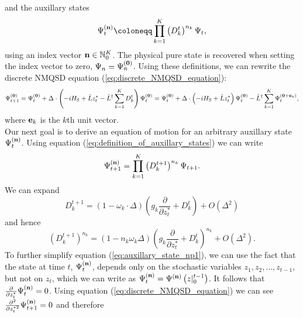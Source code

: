 and the auxillary states
\begin{equation}
    \label{eq:definition_of_auxillary_states}
    \Psi_t^{(\vectorbold{n})} \coloneqq \prod_{k=1}^{K} \left(D_k^t\right)^{n_k}\Psi_t,
\end{equation}
using an index vector $\vectorbold{n}\in\mathbb{N}_0^{K}$. The physical pure state is
recovered when setting the index vector to zero, $\Psi_n = \Psi_n^{(\vectorbold{0})}$.
Using these definitions, we can rewrite the discrete NMQSD equation (\ref{eq:discrete_NMQSD_equation}):
\begin{equation*}
    \Psi_{t+1}^{(\vectorbold{0})} = \Psi_{t}^{(\vectorbold{0})} + \Delta \cdot \left(
        -iH_\text{S} + \hat{L}z_t^* - \hat{L}^\dagger\sum_{k=1}^{K}D_k^t
    \right) \Psi_{t}^{(\vectorbold{0})}
    = \Psi_{t}^{(\vectorbold{0})} + \Delta \cdot \left(
        -iH_\text{S} + \hat{L}z_t^*
    \right) \Psi_{t}^{(\vectorbold{0})} - \hat{L}^\dagger\sum_{k=1}^{K}\Psi_t^{(\vectorbold{0}+\vectorbold{e}_k)},
\end{equation*}
where $\vectorbold{e}_k$ is the $k$th unit vector.
\\
Our next goal is to derive an equation of motion for an arbitrary auxillary state $\Psi_t^{(\vectorbold{n})}$.
Using equation (\ref{eq:definition_of_auxillary_states}) we can write
\begin{equation}
    \label{eq:auxillary_state_np1}
    \Psi_{t+1}^{(\vectorbold{n})} = \prod_{k=1}^{K} \left(D_k^{t+1}\right)^{n_k} \Psi_{t+1}.
\end{equation}
We can expand
\begin{equation*}
    D_k^{t+1} = \left(1-\omega_k\cdot\Delta\right)\left(g_k\frac{\partial}{\partial z_t^*} + D_k^t\right) + O\left(\Delta^2\right)
\end{equation*}
and hence
\begin{equation*}
    \left(D_k^{t+1}\right)^{n_k} = 
    \left(1-n_k\omega_k\Delta\right)
    \left(g_k\frac{\partial}{\partial z_t^*} + D_k^t\right)^{n_k} + O\left(\Delta^2\right).
\end{equation*}
To further simplify equation (\ref{eq:auxillary_state_np1}), we can use the fact that the state
at time $t$, $\Psi^{(\vectorbold{n})}_t$, depends only on the stochastic variables $z_1, z_2, \dots, z_{t-1}$, but not
on $z_t$, which we can write as $\Psi^{(\vectorbold{n})}_t=\Psi^{(\vectorbold{n})}\left(z|_0^{t-1}\right)$. It follows that
$\frac{\partial}{\partial z_t^*}\Psi^{(\vectorbold{n})}_t = 0$. Using equation (\ref{eq:discrete_NMQSD_equation})
we can see $\frac{\partial^2}{\partial z_t^{*2}}\Psi^{(\vectorbold{n})}_{t+1} = 0$ and therefore
